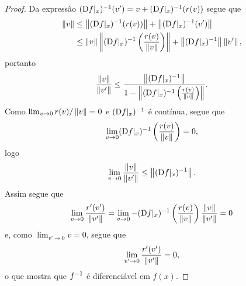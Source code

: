 \begin{proof}
Da expressão $(\mathrm{D} f|_x)^{-1} (v') = v + (\mathrm{D} f|_x)^{-1}(r(v))$ segue que
	\begin{align*}
	\left\Vert{v}\right\Vert &\leq \left\Vert{(\mathrm{D}f|_x)^{-1}(r(v))}\right\Vert + \left\Vert{(\mathrm{D}f|_x)^{-1}(v')}\right\Vert \\
		&\leq \left\Vert{v}\right\Vert \left\Vert{(\mathrm{D}f|_x)^{-1}\left(\frac{r(v)}{\left\Vert{v}\right\Vert}\right) }\right\Vert + \left\Vert{(\mathrm{D}f|_x)^{-1}}\right\Vert \left\Vert{v'}\right\Vert,
	\end{align*}
portanto
	\begin{equation*}
	\frac{\left\Vert{v}\right\Vert}{\left\Vert{v'}\right\Vert} \leq \frac{\left\Vert{(\mathrm{D}f|_x)^{-1}}\right\Vert}{1-\left\Vert{(\mathrm{D}f|_x)^{-1}\left(\frac{r(v)}{\left\Vert{v}\right\Vert}\right)}\right\Vert}.
	\end{equation*}
Como $\lim_{v \to 0} r(v)/\left\Vert{v}\right\Vert = 0$ e $(\mathrm{D} f|_x)^{-1}$ é contínua, segue que
	\begin{equation*}
	\lim_{v \to 0} (\mathrm{D} f|_x)^{-1} \left(\frac{r(v)}{\left\Vert{v}\right\Vert}\right) = 0,
	\end{equation*}
logo
	\begin{equation*}
	\lim_{v \to 0} \frac{\left\Vert{v}\right\Vert}{\left\Vert{v'}\right\Vert} \leq \left\Vert{(\mathrm{D}f|_x)^{-1}}\right\Vert.
	\end{equation*}
Assim segue que
	\begin{equation*}
	\lim_{v \to 0} \frac{r'(v')}{\left\Vert{v'}\right\Vert} = \lim_{v \to 0} - (\mathrm{D} f|_x)^{-1} \left( \frac{r(v)}{\left\Vert{v}\right\Vert} \right) \frac{\left\Vert{v}\right\Vert}{\left\Vert{v'}\right\Vert}  = 0
	\end{equation*}
e, como $\lim_{v' \to 0} v = 0$, segue que
	\begin{equation*}
	\lim_{v' \to 0} \frac{r'(v')}{\left\Vert{v'}\right\Vert} = 0,
	\end{equation*}
o que mostra que $f^{-1}$ é diferenciável em $f(x)$.

\begin{comment}
Agora, suponhamos que $f$ é fortemente diferenciável em $x$. Seja $\varepsilon \in \R_{>0}$. Como $f$ é fortemente diferenciável em $x$, para algum $\delta' \in \R_{>0}$ vale que, para todos $v,w \in \bola{0}{\delta'}$,
	\begin{equation*}
	\nor{r(w) - r(v)} \leq \varepsilon\nor{w-v}.
	\end{equation*}

Para $v = f\inv(f(x) + v') - f\inv(f(x))$ e $w = f\inv(f(x) + w') - f\inv(f(x))$, tem-se
	\begin{equation*}
	r'(v') - r'(w') = \D f|_x(r(w) - r(v)),
	\end{equation*}
logo
	\begin{equation*}
	\nor{r'(v') - r'(w')} \leq \nor{\D f|_x}\nor{(r(w) - r(v))},
	\end{equation*}
pois $\D f|_x$ é linear e contínua.%
Assim, segue que
	\begin{equation*}
	\nor{r'(v') - r'(w')} \leq \nor{\D f|_x}\varepsilon\nor{w-v}
	\end{equation*}


\end{comment}
\end{proof}
